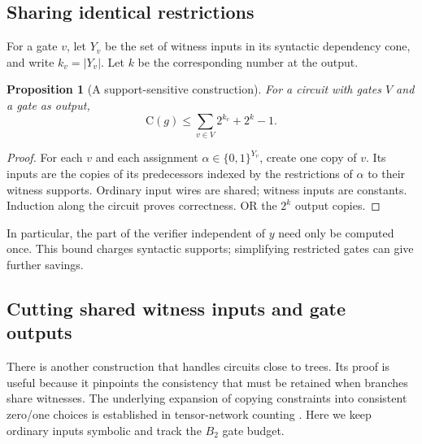 \documentclass[11pt]{article}
\newtheorem{proposition}[theorem]{Proposition}
\theoremstyle{definition}
\theoremstyle{remark}
\newcommand{\B}{\{0,1\}}
\newcommand{\C}{\mathrm{C}}
\begin{document}
\subsection{Sharing identical restrictions}

For a gate $v$, let $Y_v$ be the set of witness inputs in its syntactic
dependency cone, and write $k_v=|Y_v|$. Let $k$ be the corresponding
number at the output.

\begin{proposition}[A support-sensitive construction]\label{prop:support}
For a circuit with gates $V$ and a gate as output,
\begin{equation}\label{eq:support}
 \C(g)\le\sum_{v\in V}2^{k_v}+2^k-1.
\end{equation}
\end{proposition}
\begin{proof}
For each $v$ and each assignment $\alpha\in\B^{Y_v}$, create one
copy of $v$. Its inputs are the copies of its predecessors indexed by
the restrictions of $\alpha$ to their witness supports. Ordinary input
wires are shared; witness inputs are constants. Induction along the
circuit proves correctness. OR the $2^k$ output copies.
\end{proof}

In particular, the part of the verifier independent of $y$ need only
be computed once. This bound charges syntactic supports; simplifying
restricted gates can give further savings.

\subsection{Cutting shared witness inputs and gate outputs}

There is another construction that handles circuits close to trees.
Its proof is useful because it pinpoints the consistency that must be
retained when branches share witnesses. The underlying expansion of
copying constraints into consistent zero/one choices is established
in tensor-network counting
\citep[Theorem 17 of the author version]{BiamonteMortonTurner2015}.
Here we keep ordinary inputs symbolic and track the $B_2$ gate budget.
\end{document}
